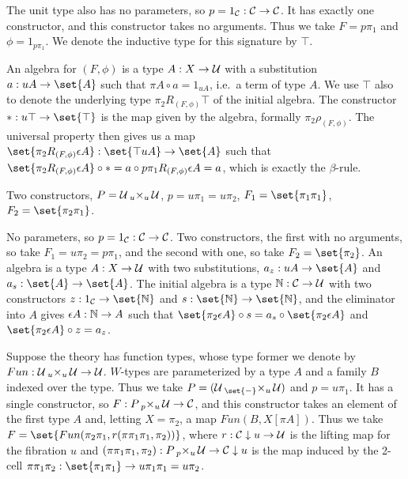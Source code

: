 \documentclass[../thesis.tex]{subfiles}
\begin{document}
\begin{example}
  The unit type also has no parameters, so $p = 1_\cC : \cC \to \cC$. It has exactly one constructor, and
  this constructor takes no arguments. Thus we take $F = p\pi_1$ and $\phi = 1_{p\pi_1}$. We denote the
  inductive type for this signature by $\top$.

  An algebra for $(F,\phi)$ is a type $A : X \to \cU$ with a substitution $a : uA \to \set{A}$ such that
  $\pi A \circ a = 1_{uA}$, i.e.\ a term of type $A$. We use $\top$ also to denote the underlying type
  $\pi_2 R_{(F,\phi)}\top$ of the initial algebra. The constructor $* : u\top \to \set{\top}$ is the map
  given by the algebra, formally $\pi_2 \rho_{(F,\phi)}$. The universal property then gives us a map
  $\set{\pi_2R_{(F,\phi)}\epsilon A} : \set{\top uA} \to \set{A}$ such that $\set{\pi_2 R_{(F,\phi)}\epsilon A}
  \circ * = a \circ p\pi_1R_{(F,\phi)}\epsilon A = a$, which is exactly the
  $\beta$-rule.
\end{example}

\begin{example}
  Two constructors, $P = \cU \pb[u]{u} \cU$, $p = u\pi_1 = u\pi_2$, $F_1 = \set{\pi_1\pi_1}$, $F_2 =
  \set{\pi_2\pi_1}$. 
\end{example}

\begin{example}
  No parameters, so $p = 1_\cC : \cC \to \cC$. Two constructors, the first with no arguments, so take
  $F_1 = u\pi_2 = p\pi_1$, and the second with one, so take $F_2 = \set{\pi_2}$. An algebra is a type
  $A : X \to \cU$ with two substitutions, $a_z : uA \to \set{A}$ and $a_s : \set{A} \to \set{A}$.
  The initial algebra is a type $\bN : \cC \to \cU$ with two constructors $z : 1_\cC \to \set{\bN}$ and
  $s : \set{\bN} \to \set{\bN}$, and the eliminator into $A$ gives $\epsilon A : \bN \to A$ such that
  $\set{\pi_2 \epsilon A} \circ s = a_s \circ \set{\pi_2 \epsilon A}$ and $\set{\pi_2 \epsilon A} \circ z
  = a_z$.
\end{example}

\begin{example}[W-types]
  Suppose the theory has function types, whose type former we denote by $Fun : \cU \pb[u]{u} \cU \to \cU$.
  $W$-types are parameterized by a type $A$ and a family $B$ indexed over the type. Thus we take $P = (\cU
  \pb[\set{-}] {u} \cU)$ and $p = u\pi_1$. It has a single constructor, so $F : P \pb[p]{u} \cU \to \cC$,
  and this constructor takes an element of the first type $A$ and, letting $X = \pi_2$, a map $Fun(B, X[
  \pi A])$. Thus we take $F = \set{Fun(\pi_2\pi_1, r(\pi\pi_1\pi_1, \pi_2))}$, where $r : \cC \comma u \to
  \cU$ is the lifting map for the fibration $u$ and $(\pi\pi_1\pi_1, \pi_2) : P \pb[p]{u} \cU \to \cC
  \comma u$ is the map induced by the 2-cell $\pi\pi_1\pi_2 : \set{\pi_1\pi_1} \to u\pi_1\pi_1 = u\pi_2$.
\end{example}
\end{document}
